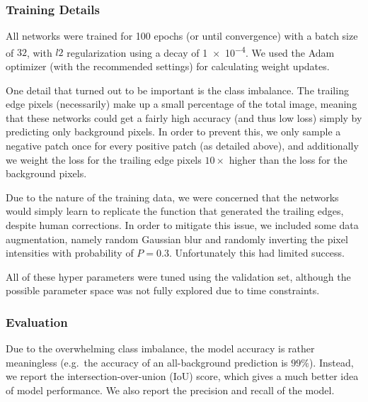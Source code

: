 
\subsubsection{Training Details}

All networks were trained for 100 epochs (or until convergence) with a batch size of $32$, with $l2$ regularization using a decay of \num{1e-4}.
We used the Adam optimizer \cite{kingma2014adam} (with the recommended settings) for calculating weight updates.

One detail that turned out to be important is the class imbalance.
The trailing edge pixels (necessarily) make up a small percentage of the total image, meaning that these networks could get a fairly high accuracy (and thus low loss) simply by predicting only background pixels.
In order to prevent this, we only sample a negative patch once for every positive patch (as detailed above), and additionally we weight the loss for the trailing edge pixels $10\times$ higher than the loss for the background pixels.

Due to the nature of the training data, we were concerned that the networks would simply learn to replicate the function that generated the trailing edges, despite human corrections.
In order to mitigate this issue, we included some data augmentation, namely random Gaussian blur and randomly inverting the pixel intensities with probability of $P=0.3$.
Unfortunately this had limited success.


All of these hyper parameters were tuned using the validation set, although the possible parameter space was not fully explored due to time constraints.

\subsubsection{Evaluation}

Due to the overwhelming class imbalance, the model accuracy is rather meaningless (e.g.\ the accuracy of an all-background prediction is $99\%$).
Instead, we report the intersection-over-union (IoU) score, which gives a much better idea of model performance.
We also report the precision and recall of the model.



